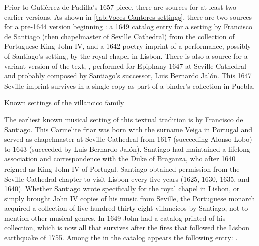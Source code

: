 Prior to Gutiérrez de Padilla's 1657 piece, there are sources for at least two
earlier versions. 
As shown in \cref{tab:Voces-Cantores-settings}, there are two sources for a
pre-1644 version beginning : a 1649 catalog
entry for a setting by Francisco de Santiago (then chapelmaster of Seville
Cathedral) from the collection of Portuguese King John IV, and a 1642 poetry
imprint of a performance, possibly of Santiago's setting, by the royal chapel in
Lisbon.
There is also a source for a variant version of the text, , performed for Epiphany 1647 at Seville Cathedral and probably composed
by Santiago's successor, Luis Bernardo Jalón.
This 1647 Seville imprint survives in a single copy as part of a binder's
collection in Puebla.

\begin{table}
    \caption{Known settings of the  villancico
    family}

    \label{tab:Voces-Cantores-settings}
\end{table}

The earliest known musical setting of this textual tradition is by Francisco de
Santiago.
This Carmelite friar was born with the surname Veiga in Portugal and served as
chapelmaster at Seville Cathedral from 1617 (succeeding Alonso Lobo) to 1643
(succeeded by Luis Bernardo Jalón).%
    \Autocites{Stevenson:SantiagoF}{Perez:DMEH-Santiago} 
Santiago had maintained a lifelong association and correspondence with the Duke
of Braganza, who after 1640 reigned as King John IV of Portugal.
Santiago obtained permission from the Seville Cathedral chapter to visit Lisbon
every five years (1625, 1630, 1635, and 1640).
Whether Santiago wrote specifically for the royal chapel in Lisbon, or simply
brought John IV copies of his music from Seville, the Portuguese monarch
acquired a collection of five hundred thirty-eight villancicos by Santiago, not
to mention other musical genres.
In 1649 John had a catalog printed of his collection, which is now all that
survives after the fires that followed the Lisbon earthquake of 1755.
Among the  in the
catalog appears the following entry:
.%
    \Autocites
    [caixão 26, ]{JohnIV:Catalog}
    [see also][]{Ribeiro:JohnIV}

